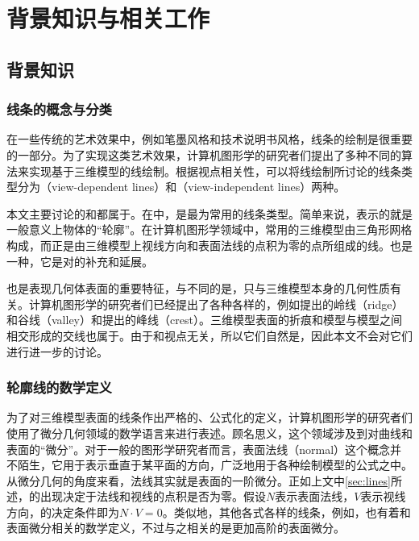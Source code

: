 \chapter{背景知识与相关工作}

\section{背景知识}

\subsection{线条的概念与分类}
\label{sec:diff_geo}

在一些传统的艺术效果中，例如笔墨风格和技术说明书风格，线条的绘制是很重要的一部分。为了实现这类艺术效果，计算机图形学的研究者们提出了多种不同的算法来实现基于三维模型的线绘制。根据视点相关性，可以将线绘制所讨论的线条类型分为\vdl{}（view-dependent lines）和\vidl{}（view-independent lines）两种。

本文主要讨论的\con{}和\scon{}都属于\vdl{}。在\vdl{}中，\con{}是最为常用的线条类型。简单来说，\con{}表示的就是一般意义上物体的“轮廓”。在计算机图形学领域中，常用的三维模型由三角形网格构成，而\con{}正是由三维模型上视线方向和表面法线的点积为零的点所组成的线。\scon{}也是一种\vdl{}，它是对\con{}的补充和延展。

\vidl{}也是表现几何体表面的重要特征，与\vdl{}不同的是，\vidl{}只与三维模型本身的几何性质有关。计算机图形学的研究者们已经提出了各种各样的\vdl{}，例如\citeauthor{ohtake2004ridge}提出的\cite{ohtake2004ridge}岭线（ridge）和谷线（valley）和\citeauthor{yoshizawa2005fast}提出的峰线（crest）\cite{yoshizawa2005fast}。三维模型表面的折痕和模型与模型之间相交形成的交线也属于\vidl{}。由于\vidl{}和视点无关，所以它们自然是\stc{}，因此本文不会对它们进行进一步的讨论。

\subsection{轮廓线的数学定义}
\label{sec:}

为了对三维模型表面的线条作出严格的、公式化的定义，计算机图形学的研究者们使用了微分几何领域的数学语言来进行表述。顾名思义，这个领域涉及到对曲线和表面的“微分”。对于一般的图形学研究者而言，表面法线（normal）这个概念并不陌生，它用于表示垂直于某平面的方向，广泛地用于各种绘制模型的公式之中。从微分几何的角度来看，法线其实就是表面的一阶微分。正如上文中\autoref{sec:lines}所述，\con{}的出现决定于法线和视线的点积是否为零。假设$N$表示表面法线，$V$表示视线方向，\con{}的决定条件即为$N\cdot{V} = 0$。类似地，其他各式各样的线条，例如\scon{}，也有着和表面微分相关的数学定义，不过与之相关的是更加高阶的表面微分。

